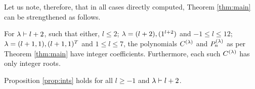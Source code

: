 Let us note, therefore, that in all cases directly computed, Theorem \ref{thm:main} can be strengthened as follows.  %

\begin{proposition}\label{prop:ints} For $\lambda \vdash l+2$, such that either, $l\leq 2$; $\lambda=(l+2), (1^{l+2})$ and $-1\leq l\leq 12$; $\lambda=(l+1,1), (l+1,1)^T$ and $1\leq l \leq 7$, the polynomials $C^{(\lambda)}$ and $P_n^{(\lambda)}$ as per Theorem \ref{thm:main} have integer coefficients. Furthermore, each such $C^{(\lambda)}$ has only integer roots. \end{proposition}



\begin{conjecture} Proposition \ref{prop:ints} holds for all $l\geq -1$ and $\lambda\vdash l+2$.
\end{conjecture}

